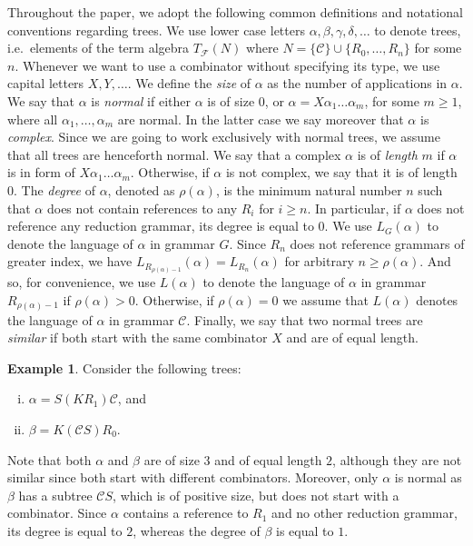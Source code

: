 \documentclass[11pt,a4paper]{amsart}
\theoremstyle{definition}
\newtheorem{example}[theorem]{Example}
\newcommand{\rank}[1]{\rho(#1)}
\begin{document}
Throughout the paper, we adopt the following common definitions and notational
conventions regarding trees. We use lower case letters
$\alpha,\beta,\gamma,\delta,\ldots$ to denote trees, i.e.~elements of the term
algebra $T_{\mathcal{F}}(N)$ where $N = \{\mathcal{C}\} \cup \{R_0,\ldots,R_n\}$
for some $n$. Whenever we want to use a combinator without specifying its type,
we use capital letters $X,Y,\ldots$. We define the \emph{size} of $\alpha$ as
the number of applications in $\alpha$.  We say that $\alpha$ is \emph{normal}
if either $\alpha$ is of size $0$, or $\alpha = X \alpha_1 \ldots \alpha_m$, for
some $m \geq 1$, where all $\alpha_1,\ldots,\alpha_m$ are normal. In the latter
case we say moreover that $\alpha$ is \emph{complex}. Since we are going to work exclusively with normal trees, we assume that all trees are henceforth normal.
We say that a complex $\alpha$ is of \emph{length} $m$ if $\alpha$ is in form of $X \alpha_1 \ldots \alpha_m$. Otherwise, if $\alpha$ is not complex, we say that it is of length $0$. The \emph{degree} of $\alpha$, denoted as $\rank{\alpha}$, is the minimum natural number $n$ such that $\alpha$ does not contain references to any $R_i$ for $i \geq n$. In particular, if $\alpha$ does not reference any reduction grammar, its degree is equal to $0$. We use $L_G(\alpha)$ to denote the language of $\alpha$ in grammar $G$. Since $R_n$ does not reference grammars of greater index, we have
$L_{R_{\rank{\alpha}-1}}(\alpha) = L_{R_n}(\alpha)$ for arbitrary $n \geq \rank{\alpha}$.
And so, for convenience, we use $L(\alpha)$ to denote the language of $\alpha$ in grammar $R_{\rank{\alpha}-1}$ if $\rank{\alpha} > 0$. Otherwise, if 
$\rank{\alpha} = 0$ we assume that $L(\alpha)$ denotes the language of $\alpha$ in grammar $\mathcal{C}$. Finally, we say that two normal trees are
\emph{similar} if both start with the same combinator $X$ and are of equal
length.

\begin{example}
        Consider the following trees:
        \begin{enumerate}[(i)]
                \item $\alpha = S (K R_1) \mathcal{C}$, and
            \item $\beta = K (\mathcal{C} S) R_0$.
        \end{enumerate}
        Note that both $\alpha$ and $\beta$ are of size $3$ and of equal length
        $2$, although they are not similar since both start with
        different combinators. Moreover, only $\alpha$ is normal as $\beta$ has
        a subtree $\mathcal{C} S$, which is of positive size, but does not start
        with a combinator. Since $\alpha$ contains a reference to $R_1$ and no
        other reduction grammar, its degree is equal to $2$, whereas the degree of
        $\beta$ is equal to $1$.
\end{example}
\end{document}

